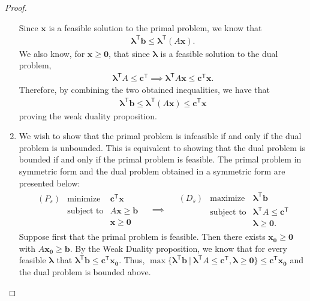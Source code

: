 \documentclass[12pt]{article}
\theoremstyle{definition}
\newcommand{\vc}[1]{\boldsymbol{#1}}
\newcommand{\tran}{\mathsf{T}}
\begin{document}
\begin{proof}
\begin{enumerate}
      Since $\vc{x}$ is a feasible solution to the primal problem, we know that
      \begin{align*}
        \vc{\lambda}^\tran \vc{b}\leq \vc{\lambda}^\tran (A\vc{x}).
      \end{align*}
      We also know, for $\vc{x} \geq \vc{0}$, that since $\vc{\lambda}$ is a feasible
      solution to the dual problem,
      \begin{align*}
        \vc{\lambda}^\tran A \leq \vc{c}^\tran \implies \vc{\lambda}^\tran A\vc{x} \leq \vc{c}^\tran\vc{x}.
      \end{align*}
      Therefore, by combining the two obtained inequalities, we have that
      \begin{align*}
        \vc{\lambda}^\tran \vc{b}\leq \vc{\lambda}^\tran (A\vc{x}) \leq \vc{c}^\tran\vc{x}
      \end{align*}
      proving the weak duality proposition.
    \item We wish to show that the primal problem is infeasible if and only if the dual problem is unbounded.
      This is equivalent to showing that the dual problem is bounded if and only if the primal problem is feasible.
      The primal problem in symmetric form and the dual problem obtained in a symmetric form are presented below:
      \begin{align*}
        \begin{array}{lrl}
          (P_s) & \text{minimize} & \vc{c}^\tran \vc{x} \\
          & \text{subject to} & A\vc{x} \geq \vc{b} \\
          & & \vc{x} \geq \vc{0}
        \end{array}
        \quad
        \implies
        \quad
        \begin{array}{lrl}
          (D_s) & \text{maximize} & \vc{\lambda}^\tran \vc{b} \\
          & \text{subject to} & \vc{\lambda}^\tran A \leq \vc{c}^\tran \\
          & & \vc{\lambda} \geq \vc{0}.
        \end{array}
      \end{align*}
      Suppose first that the primal problem is feasible. Then there exists $\vc{x_0} \geq \vc{0}$ with $A\vc{x_0} \geq \vc{b}$.
      By the Weak Duality proposition, we know that for every feasible
      $\vc{\lambda}$ that $\vc{\lambda}^\tran \vc{b} \leq \vc{c}^\tran\vc{x_0}$. Thus,
      $\max\{\vc{\lambda}^\tran \vc{b} \ |\ \vc{\lambda}^\tran A \leq \vc{c}^\tran, \vc{\lambda}\geq \vc{0} \} \leq \vc{c}^\tran\vc{x_0}$
      and the dual problem is bounded above.


\end{enumerate}
\end{proof}
\end{document}
